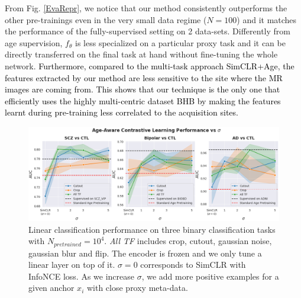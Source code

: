 \documentclass[runningheads]{llncs}
\newcommand{\rebuttal}[1]{\textcolor{black}{#1}}
\begin{document}
From Fig. \ref{EvaRepr}, we notice that our method consistently outperforms the other pre-trainings even in the very small data regime ($N=100$) and it matches the performance of the fully-supervised setting on 2 data-sets. Differently from age supervision, $f_\theta$ is less specialized on a particular proxy task and it can be directly transferred on the final task at hand without fine-tuning the whole network. \rebuttal{Furthermore, compared to the multi-task approach SimCLR+Age, the features extracted by our method are less sensitive to the site where the MR images are coming from. This shows that our technique is the only one that efficiently uses the highly multi-centric dataset BHB by making the features learnt during pre-training less correlated to the acquisition sites.}


\begin{figure}[h]
    \centering
    \includegraphics[width=1\linewidth]{contrastive-age-aware_perf_sigma_N10K.png}
    \caption{Linear classification performance on three binary classification tasks with $N_{pretrained}=10^4$. \textit{All TF} includes crop, cutout, gaussian noise, gaussian blur and flip. The encoder is frozen and we only tune a linear layer on top of it. $\sigma=0$ corresponds to SimCLR \cite{chen2020simCLR} with InfoNCE loss. As we increase $\sigma$, we add more positive examples for a given anchor $x_i$ with close proxy meta-data.}
    \label{ablation_study}
\end{figure}
\end{document}
